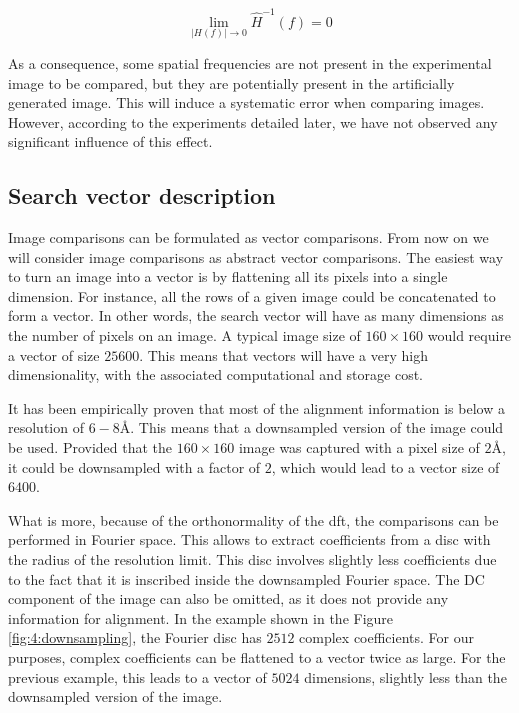 \documentclass[../main.tex]{subfiles}
\begin{document}
\begin{equation}\label{eq:4:wiener_zero}
    \lim_{\left\vert H(f) \right\vert \rightarrow 0} \hat{H}^{-1}(f) = 0
\end{equation} 

As a consequence, some spatial frequencies are not present in the experimental image to be compared, but they are potentially present in the artificially generated image. This will induce a systematic error when comparing images. However, according to the experiments detailed later, we have not observed any significant influence of this effect. 

\subsection{Search vector description}
Image comparisons can be formulated as vector comparisons. From now on we will consider image comparisons as abstract vector comparisons. The easiest way to turn an image into a vector is by flattening all its pixels into a single dimension. For instance, all the rows of a given image could be concatenated to form a vector. In other words, the search vector will have as many dimensions as the number of pixels on an image. A typical image size of $160\times160$ would require a vector of size $25600$. This means that vectors will have a very high dimensionality, with the associated computational and storage cost.

It has been empirically proven that most of the alignment information is below a resolution of $6-8 \si{\angstrom}$\cite{scheres2021}. This means that a downsampled version of the image could be used. Provided that the $160\times160$ image was captured with a pixel size of $2 \si{\angstrom}$, it could be downsampled with a factor of $2$, which would lead to a vector size of $6400$. 

What is more, because of the orthonormality of the \gls{dft}, the comparisons can be performed in Fourier space. This allows to extract coefficients from a disc with the radius of the resolution limit. This disc involves slightly less coefficients due to the fact that it is inscribed inside the downsampled Fourier space. The DC component of the image can also be omitted, as it does not provide any information for alignment. In the example shown in the Figure \ref{fig:4:downsampling}, the Fourier disc has $2512$ complex coefficients. For our purposes, complex coefficients can be flattened to a vector twice as large. For the previous example, this leads to a vector of $5024$ dimensions, slightly less than the downsampled version of the image.
\end{document}
